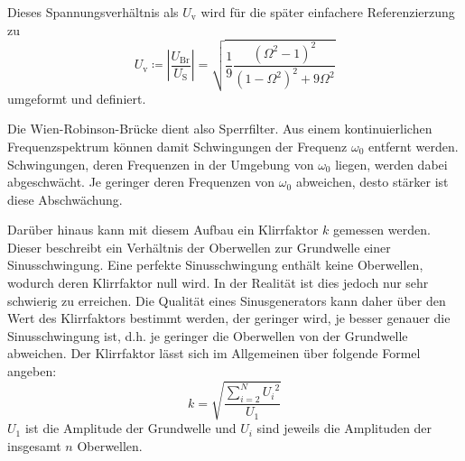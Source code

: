 Dieses Spannungsverhältnis als $U_{\text{v}}$ wird für die später einfachere Referenzierzung zu
\begin{equation}
   U_{\text{v}}\coloneq \left|\frac{U_{\text{Br}}}{U_{\text{S}}}\right| = \sqrt{\frac{1}{9}\frac{(\Omega^2 -1)^2}{(1- \Omega^2)^2 + 9\Omega^2}}
\end{equation}
umgeformt und definiert.


Die Wien-Robinson-Brücke dient also Sperrfilter. Aus einem kontinuierlichen Frequenzspektrum können damit 
Schwingungen der Frequenz $\omega_0$ entfernt werden. Schwingungen, deren Frequenzen in der Umgebung von 
$\omega_0$ liegen, werden dabei abgeschwächt. Je geringer deren Frequenzen von $\omega_0$ abweichen, desto 
stärker ist diese Abschwächung. 

Darüber hinaus kann mit diesem Aufbau ein Klirrfaktor $k$ gemessen werden. Dieser beschreibt ein Verhältnis der 
Oberwellen zur Grundwelle einer Sinusschwingung. Eine perfekte Sinusschwingung enthält keine Oberwellen, wodurch deren 
Klirrfaktor null wird. In der Realität ist dies jedoch nur sehr schwierig zu erreichen. Die Qualität eines Sinusgenerators
kann daher über den Wert des Klirrfaktors bestimmt werden, der geringer wird, je besser genauer die Sinusschwingung ist, 
d.h. je geringer die Oberwellen von der Grundwelle abweichen. Der Klirrfaktor lässt sich im Allgemeinen über folgende
Formel angeben: \begin{equation}
    \label{eqn:k}
    k = \sqrt{\frac{\sum_{i=2}^N {U_i}^2}{U_1}}
\end{equation}
$U_1$ ist die Amplitude der Grundwelle und $U_i$ sind jeweils die Amplituden der insgesamt $n$ Oberwellen.






